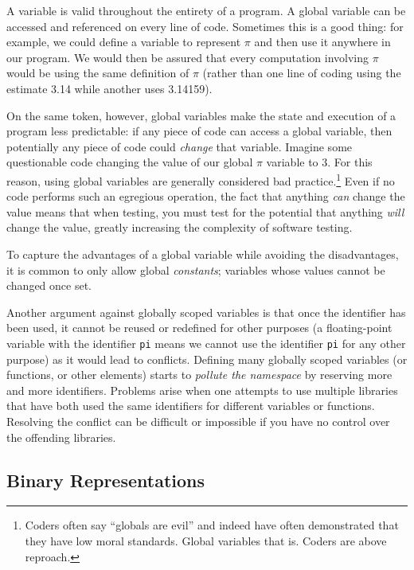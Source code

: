 A  variable is valid throughout the
entirety of a program.  A global variable can be accessed and referenced
on every line of code.  Sometimes this is a good thing: for example, we could
define a variable to represent $\pi$ and then use it anywhere in our program.
We would then be assured that every computation involving $\pi$ would be
using the same definition of $\pi$ (rather than one line of coding using the 
estimate 3.14 while another uses 3.14159).

On the same token, however, global variables make the state and 
execution of a program less predictable: if any piece of code can access a
global variable, then potentially any piece of code could \emph{change} that
variable.  Imagine some questionable code changing the value of our global
$\pi$ variable to 3.  For this reason, using global variables are generally 
considered bad practice.\footnote{Coders often say ``globals are evil'' and 
indeed have often demonstrated that they have low moral standards.  Global
variables that is.  Coders are above reproach.}  Even if no code performs
such an egregious operation, the fact that anything \emph{can} change the
value means that when testing, you must test for the potential that anything
\emph{will} change the value, greatly increasing the complexity of software
testing.

To capture the advantages of a global variable while avoiding the disadvantages, 
it is common to only allow global \emph{constants}; variables whose values 
cannot be changed once set.

Another argument against globally scoped variables is that once the identifier
has been used, it cannot be reused or redefined for other purposes (a floating-point
variable with the identifier \texttt{pi} means we cannot use the identifier
\texttt{pi} for any other purpose) as it would lead to conflicts.  
Defining many globally scoped variables (or functions, or other elements) starts
to \emph{pollute the namespace} by reserving more and more identifiers.
Problems arise when one attempts to use multiple libraries that have both
used the same identifiers for different variables or functions.  Resolving the
conflict can be difficult or impossible if you have no control over the offending
libraries.  
 
\subsection{Binary Representations}

